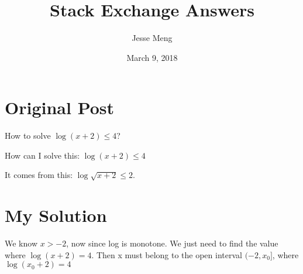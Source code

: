 \documentclass{article}
\title{Stack Exchange Answers}
\author{Jesse Meng }
\date{March 9, 2018}
\begin{document}
\maketitle

\section{Original Post}
How to solve $\log(x+2)≤4$?

How can I solve this: $\log(x+2)≤4$ 

It comes from this: $\log\sqrt{x+2}≤2$.
\section{My Solution}
We know $x>-2$, now since log is monotone. We just need to find the value where $\log(x+2)=4$. Then x must belong to the open interval $(-2,x_0]$, where $\log(x_0+2)=4$
\end{document}
